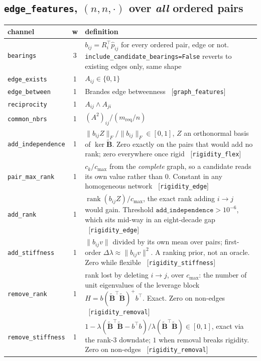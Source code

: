 \documentclass[11pt,a4paper]{article}
\newcommand{\rk}{\operatorname{rank}}
\newcommand{\Bs}{\widetilde{\mathbf{B}}}
\begin{document}
\subsection*{\texttt{edge\_features}, $(n,n,\cdot)$ over \emph{all} ordered pairs}
\begin{longtable}{p{2.9cm}cp{9.4cm}}
\toprule
channel & w & definition \\
\midrule
\endhead
\texttt{bearings} & 3 & $b_{ij}=R_i^{\!\top}\hat p_{ij}$ for every ordered pair, edge or not. \texttt{include\_candidate\_bearings=False} reverts to existing edges only, same shape \\
\texttt{edge\_exists} & 1 & $A_{ij}\in\{0,1\}$ \\
\texttt{edge\_between} & 1 & Brandes edge betweenness \ [\texttt{graph\_features}] \\
\texttt{reciprocity} & 1 & $A_{ij}\wedge A_{ji}$ \\
\texttt{common\_nbrs} & 1 & $(A^2)_{ij}\big/(m_{\text{req}}/n)$ \\
\texttt{add\_independence} & 1 & $\|b_{ij}Z\|_F/\|b_{ij}\|_F\in[0,1]$, $Z$ an orthonormal basis of $\ker\Bs$. Zero exactly on the pairs that would add no rank; zero everywhere once rigid \ [\texttt{rigidity\_flex}] \\
\texttt{pair\_max\_rank} & 1 & $c_k/c_{\max}$ from the \emph{complete} graph, so a candidate reads its own value rather than $0$. Constant in any homogeneous network \ [\texttt{rigidity\_edge}] \\
\texttt{add\_rank} & 1 & $\rk(b_{ij}Z)/c_{\max}$, the exact rank adding $i\to j$ would gain. Threshold $\texttt{add\_independence}>10^{-6}$, which sits mid-way in an eight-decade gap \ [\texttt{rigidity\_edge}] \\
\texttt{add\_stiffness} & 1 & $\|b_{ij}v\|$ divided by its own mean over pairs; first-order $\Delta\lambda\approx\|b_{ij}v\|^2$. A ranking prior, not an oracle. Zero while flexible \ [\texttt{rigidity\_stiffness}] \\
\texttt{remove\_rank} & 1 & rank lost by deleting $i\to j$, over $c_{\max}$: the number of unit eigenvalues of the leverage block $H=b(\Bs^{\!\top}\Bs)^{+}b^{\!\top}$. Exact. Zero on non-edges \ [\texttt{rigidity\_removal}] \\
\texttt{remove\_stiffness} & 1 & $1-\lambda(\Bs^{\!\top}\Bs-b^{\!\top}b)/\lambda(\Bs^{\!\top}\Bs)\in[0,1]$, exact via the rank-3 downdate; $1$ when removal breaks rigidity. Zero on non-edges \ [\texttt{rigidity\_removal}] \\
\bottomrule
\end{longtable}
\end{document}
